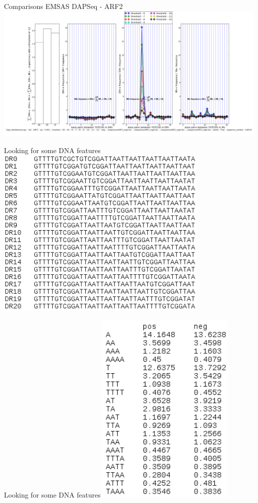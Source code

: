 \documentclass{beamer}
\begin{document}
\begin{frame}{Comparisons EMSAS DAPSeq - ARF2}
  \includegraphics[width=1\textwidth,height=0.8\textheight,center]{ARF2_interdistances_-6-7-8-9-10-11-12_points_4Neg.png}
\end{frame}

\begin{frame}{Looking for some DNA features}
  \includegraphics[width=0.77\textwidth,height=0.7\textheight,center]{tableau_DR.png}
\end{frame}

\begin{frame}{Looking for some DNA features}
  \includegraphics[width=0.5\textwidth,height=0.6\textheight,center]{A_and_T_rate.png}
\end{frame}
\end{document}
